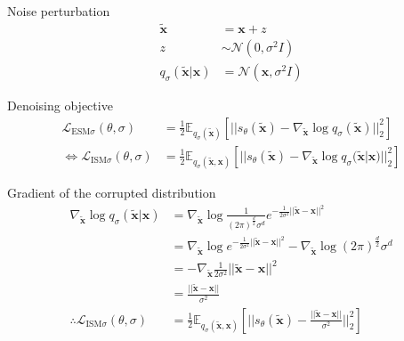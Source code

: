 \documentclass[handout, aspectratio=169,xcolor=dvipsnames]{beamer}
\newcommand{\bx}{\mathbf{x}}
\newcommand{\btx}{\mathbf{\tilde{x}}}
\newcommand{\qs}{q_{\sigma}}
\newcommand{\nbtx}{\nabla_{\btx}}
\begin{document}
\begin{frame}{Noise perturbation}
\pause
\begin{align*}
  \btx &= \bx + z\\
  z &\sim \mathcal{N}(0, \sigma^2 I)\\
    \qs(\btx | \bx) &= \mathcal{N}(\bx, \sigma^2 I)
  \end{align*}
\end{frame}

\begin{frame}{Denoising objective}
  \begin{align*}
    \mathcal{L}_{\text{ESM} \sigma}(\theta, \sigma) &= \frac{1}{2} \mathbb{E}_{\qs(\btx)} \left[|| s_\theta(\btx) - \nbtx \log q_\sigma(\btx) ||_2^2 \right]\\
    \iff \mathcal{L}_{\text{ISM} \sigma}(\theta, \sigma) &= \frac{1}{2} \mathbb{E}_{\qs(\btx, \bx)} \left[ ||s_\theta(\btx) - \nbtx \log q_{\sigma} (\btx | \bx) ||_2^2 \right]
  \end{align*}
\end{frame}

\begin{frame}{Gradient of the corrupted distribution}
  \begin{align*}
    \nbtx \log \qs (\btx | \bx) &= \nbtx \log \frac{1}{(2\pi)^{\frac{d}{2}}  \sigma^d} e^{-\frac{1}{2 \sigma^2} || \btx - \bx||^2}\\
                        &= \nbtx \log e^{-\frac{1}{2 \sigma^2} || \btx - \bx||^2} - \nbtx \log (2\pi)^{\frac{d}{2}} \sigma^d\\
                        &= - \nbtx \frac{1}{2 \sigma^2} || \btx - \bx||^2\\
                        &= \frac{|| \btx - \bx||}{\sigma^2}\\
    \therefore \mathcal{L}_{\text{ISM} \sigma}(\theta, \sigma) &= \frac{1}{2} \mathbb{E}_{\qs(\btx, \bx)} \left[ ||s_\theta(\btx) -  \frac{|| \btx - \bx||}{\sigma^2} ||_2^2 \right]
  \end{align*}
\end{frame}
\end{document}
